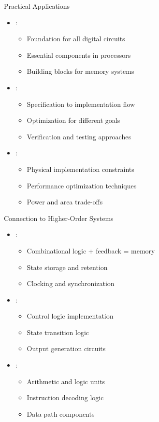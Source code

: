 \begin{frame}{Practical Applications}
\begin{itemize}
\item {}:
\begin{itemize}
\item Foundation for all digital circuits
\item Essential components in processors
\item Building blocks for memory systems
\end{itemize}
\vspace{0.3cm}
\item {}:
\begin{itemize}
\item Specification to implementation flow
\item Optimization for different goals
\item Verification and testing approaches
\end{itemize}
\vspace{0.3cm}
\item {}:
\begin{itemize}
\item Physical implementation constraints
\item Performance optimization techniques
\item Power and area trade-offs
\end{itemize}
\end{itemize}
\end{frame}

\begin{frame}{Connection to Higher-Order Systems}
\begin{itemize}
\item {}:
\begin{itemize}
\item Combinational logic + feedback = memory
\item State storage and retention
\item Clocking and synchronization
\end{itemize}
\vspace{0.3cm}
\item {}:
\begin{itemize}
\item Control logic implementation
\item State transition logic
\item Output generation circuits
\end{itemize}
\vspace{0.3cm}
\item {}:
\begin{itemize}
\item Arithmetic and logic units
\item Instruction decoding logic
\item Data path components
\end{itemize}
\end{itemize}
\end{frame}

